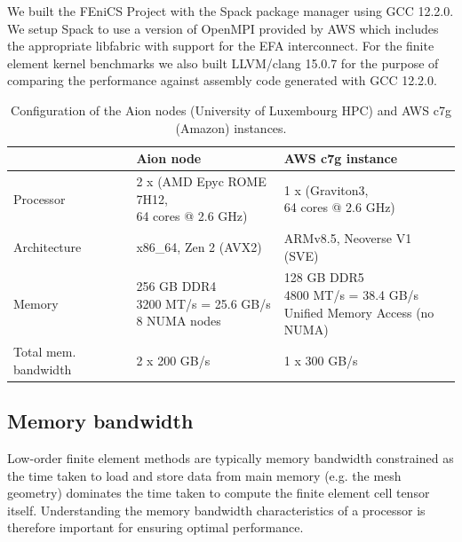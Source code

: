 We built the FEniCS Project with the Spack package manager using GCC 12.2.0. We
setup Spack to use a version of OpenMPI provided by AWS which includes the
appropriate libfabric with support for the EFA interconnect. For the finite
element kernel benchmarks we also built LLVM/clang 15.0.7 for the purpose of
comparing the performance against assembly code generated with GCC 12.2.0.

\begin{table}
  \footnotesize
  \renewcommand{\arraystretch}{1.5}
  \begin{tabular}{l|l|l}
                              & Aion node                                                          & AWS c7g instance \\ \hline \hline
    Processor               & \makecell[l]{2 x (AMD Epyc ROME 7H12, \\ 64 cores @ 2.6 GHz)} & \makecell[l]{1 x (Graviton3, \\ 64 cores @ 2.6 GHz)} \\ \hline
      Architecture            & x86\_64, Zen 2 (AVX2)                                         & ARMv8.5, Neoverse V1 (SVE) \\ \hline
    Memory                  & \makecell[l]{256 GB DDR4 \\ 3200 MT/s = 25.6 GB/s \\ 8 NUMA nodes}            & \makecell[l]{128 GB DDR5 \\ 4800 MT/s = 38.4 GB/s \\ Unified Memory Access (no NUMA) } \\ \hline
      Total mem. bandwidth         & 2 x 200 GB/s                                                    & 1 x 300 GB/s \\ \hline
  \end{tabular}
  \vspace{5pt}
  \caption{Configuration of the Aion nodes (University of Luxembourg HPC) and AWS c7g (Amazon) instances.}
  \label{tab:aion-aws-config}
\end{table}


\subsection*{Memory bandwidth}

Low-order finite element methods are typically memory bandwidth constrained as
the time taken to load and store data from main memory (e.g. the mesh geometry)
dominates the time taken to compute the finite element cell tensor itself.
Understanding the memory bandwidth characteristics of a processor is therefore
important for ensuring optimal performance.

